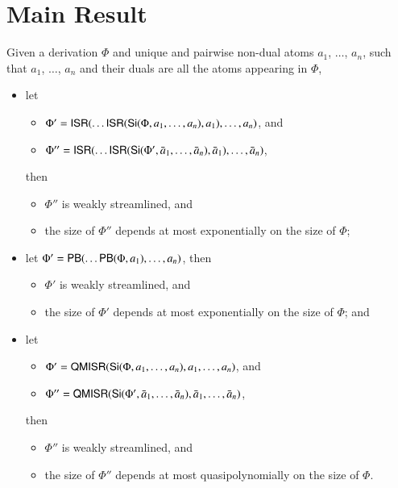 \chapter{Main Result}\label{chapter:MainResult}

\begin{theorem}\label{theorem:WeakStreamlining}
Given a derivation $\Phi$ and unique and pairwise non-dual atoms $a_1$, $\dots$, $a_n$, such that $a_1$, $\dots$, $a_n$ and their duals are all the atoms appearing in $\Phi$,
\begin{itemize}
\item let
\begin{itemize}
\item $\Phi'=\mathsf{ISR}(\dots\mathsf{ISR}(\mathsf{Si}(\Phi,a_1,\dots,a_n),a_1),\dots,a_n)$, and
\item $\Phi''=\mathsf{ISR}(\dots\mathsf{ISR}(\mathsf{Si}(\Phi',\bar a_1,\dots,\bar a_n),\bar a_1),\dots,\bar a_n)$,
\end{itemize}
then
\begin{itemize}
\item $\Phi''$ is weakly streamlined, and
\item the size of $\Phi''$ depends at most exponentially on the size of\/ $\Phi$;
\end{itemize}
\item let\/ $\Phi'=\mathsf{PB}(\dots\mathsf{PB}(\Phi,a_1),\dots,a_n)$, then
\begin{itemize}
\item $\Phi'$ is weakly streamlined, and
\item the size of\/ $\Phi'$ depends at most exponentially on the size of\/ $\Phi$; and
\end{itemize}
\item let
\begin{itemize}
\item $\Phi'=\mathsf{QMISR}(\mathsf{Si}(\Phi,a_1,\dots,a_n),a_1,\dots,a_n)$, and
\item $\Phi''=\mathsf{QMISR}(\mathsf{Si}(\Phi',\bar a_1,\dots,\bar a_n),\bar a_1,\dots,\bar a_n)$,
\end{itemize}
then
\begin{itemize}
\item $\Phi''$ is weakly streamlined, and
\item the size of\/ $\Phi''$ depends at most quasipolynomially on the size of\/ $\Phi$.
\end{itemize}
\end{itemize}
\end{theorem}

